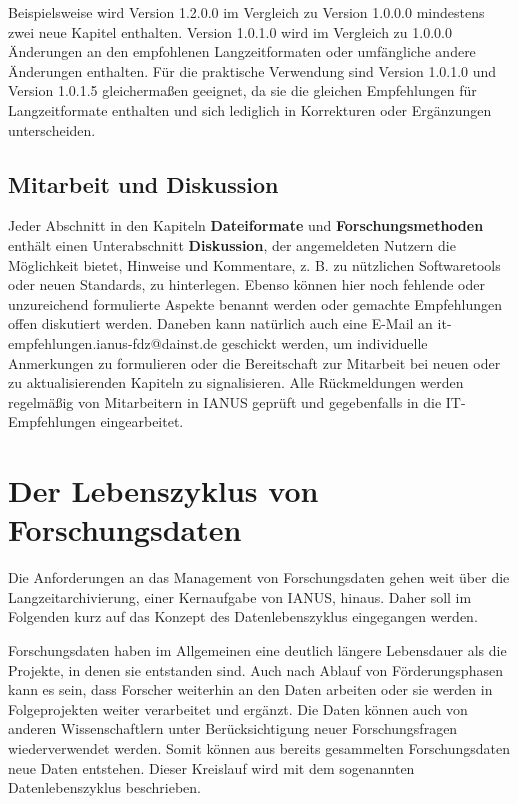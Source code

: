 Beispielsweise wird Version 1.2.0.0 im Vergleich zu Version 1.0.0.0 mindestens zwei neue Kapitel enthalten. Version 1.0.1.0 wird im Vergleich zu 1.0.0.0 Änderungen an den empfohlenen Langzeitformaten oder umfängliche andere Änderungen enthalten. Für die praktische Verwendung sind Version 1.0.1.0 und Version 1.0.1.5 gleichermaßen geeignet, da sie die gleichen Empfehlungen für Langzeitformate enthalten und sich lediglich in Korrekturen oder Ergänzungen unterscheiden. 

\subsection*{Mitarbeit und Diskussion}
Jeder Abschnitt in den Kapiteln \textbf{Dateiformate} und \textbf{Forschungsmethoden} enthält einen Unterabschnitt \textbf{Diskussion}, der angemeldeten Nutzern die Möglichkeit bietet, Hinweise und Kommentare, z. B. zu nützlichen Softwaretools oder neuen Standards, zu hinterlegen. Ebenso können hier noch fehlende oder unzureichend formulierte Aspekte benannt werden oder gemachte Empfehlungen offen diskutiert werden. Daneben kann natürlich auch eine E-Mail an it-empfehlungen.ianus-fdz@dainst.de geschickt werden, um individuelle Anmerkungen zu formulieren oder die Bereitschaft zur Mitarbeit bei neuen oder zu aktualisierenden Kapiteln zu signalisieren. Alle Rückmeldungen werden regelmäßig von Mitarbeitern in IANUS geprüft und gegebenfalls in die IT-Empfehlungen eingearbeitet. 

\newpage
\section{Der Lebenszyklus von Forschungsdaten}
\label{lebenszyklus}
Die Anforderungen an das Management von Forschungsdaten gehen weit über die Langzeitarchivierung, einer Kernaufgabe von IANUS, hinaus. Daher soll im Folgenden kurz auf das Konzept des Datenlebenszyklus eingegangen werden. 

Forschungsdaten haben im Allgemeinen eine deutlich längere Lebensdauer als die Projekte, in denen sie entstanden sind. Auch nach Ablauf von Förderungsphasen kann es sein, dass Forscher weiterhin an den Daten arbeiten oder sie werden in Folgeprojekten weiter verarbeitet und ergänzt. Die Daten können auch von anderen Wissenschaftlern unter Berücksichtigung neuer Forschungsfragen wiederverwendet werden. Somit können aus bereits gesammelten Forschungsdaten neue Daten entstehen. Dieser Kreislauf wird mit dem sogenannten Datenlebenszyklus beschrieben. 

